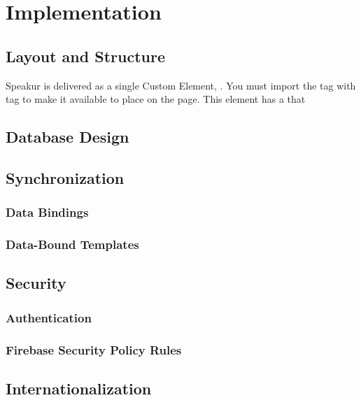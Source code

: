 \chapter{Implementation}
%


\section{Layout and Structure}
Speakur is delivered as a single Custom Element, .
You must import the tag with  tag to make it available to place on the page. 
This element has a  that 

\section{Database Design}

\section{Synchronization}

\subsection{Data Bindings}

\subsection{Data-Bound Templates}

\section{Security}

\subsection{Authentication}

\subsection{Firebase Security Policy Rules}
\label{sec:security}

\section{Internationalization}
